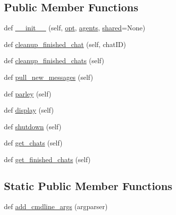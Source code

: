\subsection*{Public Member Functions}
\begin{DoxyCompactItemize}
\item 
def \hyperlink{classconvai_1_1convai__world_1_1ConvAIWorld_ab64b3e3181657add8851d6aa1cd6a4a4}{\+\_\+\+\_\+init\+\_\+\+\_\+} (self, \hyperlink{classparlai_1_1core_1_1worlds_1_1World_a3640d92718acd3e6942a28c1ab3678bd}{opt}, \hyperlink{classparlai_1_1core_1_1worlds_1_1World_a728f75194cc26ea4035047c46cf62608}{agents}, \hyperlink{classconvai_1_1convai__world_1_1ConvAIWorld_a696e5f81b80096555aec418806b405dc}{shared}=None)
\item 
def \hyperlink{classconvai_1_1convai__world_1_1ConvAIWorld_adbed66ef531f264abbee71de82ed38b8}{cleanup\+\_\+finished\+\_\+chat} (self, chat\+ID)
\item 
def \hyperlink{classconvai_1_1convai__world_1_1ConvAIWorld_a6263e23aeeed1da1714dfb48f61ab09d}{cleanup\+\_\+finished\+\_\+chats} (self)
\item 
def \hyperlink{classconvai_1_1convai__world_1_1ConvAIWorld_a06a6127d5bfcc3bd03b4913b1667e659}{pull\+\_\+new\+\_\+messages} (self)
\item 
def \hyperlink{classconvai_1_1convai__world_1_1ConvAIWorld_a3cb70be6e7c878cf78041ed2722b9238}{parley} (self)
\item 
def \hyperlink{classconvai_1_1convai__world_1_1ConvAIWorld_aba441045b286ea6345701ca6295a4ba5}{display} (self)
\item 
def \hyperlink{classconvai_1_1convai__world_1_1ConvAIWorld_a23af0c25e74dc7901662aebef74bf10c}{shutdown} (self)
\item 
def \hyperlink{classconvai_1_1convai__world_1_1ConvAIWorld_a231eeb8ff53b0b334d4ccdd6e44145b8}{get\+\_\+chats} (self)
\item 
def \hyperlink{classconvai_1_1convai__world_1_1ConvAIWorld_a86b9befc00ec10bc59bf1051bc4ff7e7}{get\+\_\+finished\+\_\+chats} (self)
\end{DoxyCompactItemize}
\subsection*{Static Public Member Functions}
\begin{DoxyCompactItemize}
\item 
def \hyperlink{classconvai_1_1convai__world_1_1ConvAIWorld_a9a63ba382d82b069fe6ddc51c2ebc0c9}{add\+\_\+cmdline\+\_\+args} (argparser)
\end{DoxyCompactItemize}
